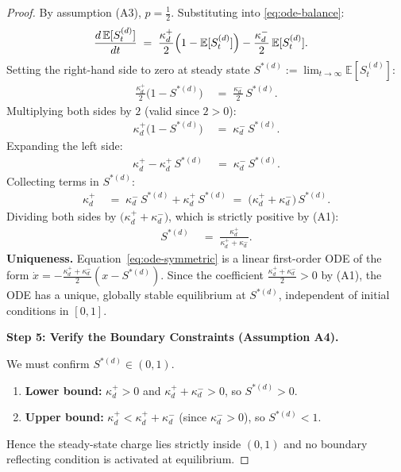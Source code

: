 \documentclass[12pt,openany]{book}
\numberwithin{equation}{chapter}
\theoremstyle{plain}
\theoremstyle{definition}
\theoremstyle{remark}
\def\mathcal#1{#1}%
\begin{document}
\begin{proof}
\noindent
By assumption (A3), $p = \tfrac{1}{2}$.  Substituting into
\eqref{eq:ode-balance}:
\begin{align}
  \frac{d\,\mathbb{E}[\mathcal{S}_t^{(d)}]}{dt}
  &\;=\;
  \frac{\kappa_d^{+}}{2}
  \Bigl(1 - \mathbb{E}[\mathcal{S}_t^{(d)}]\Bigr)
  -
  \frac{\kappa_d^{-}}{2}
  \,\mathbb{E}[\mathcal{S}_t^{(d)}].
  \label{eq:ode-symmetric}
\end{align}
Setting the right-hand side to zero at steady state
$\mathcal{S}^{*(d)} := \lim_{t\to\infty}
\mathbb{E}[\mathcal{S}_t^{(d)}]$:
\begin{align}
  \frac{\kappa_d^{+}}{2}
  \bigl(1 - \mathcal{S}^{*(d)}\bigr)
  &\;=\;
  \frac{\kappa_d^{-}}{2}\,\mathcal{S}^{*(d)}.
  \label{eq:balance-eqn}
\end{align}
Multiplying both sides by $2$ (valid since $2 > 0$):
\begin{align}
  \kappa_d^{+}\bigl(1 - \mathcal{S}^{*(d)}\bigr)
  &\;=\;
  \kappa_d^{-}\,\mathcal{S}^{*(d)}.
  \label{eq:balance-no-half}
\end{align}
Expanding the left side:
\begin{align}
  \kappa_d^{+} - \kappa_d^{+}\,\mathcal{S}^{*(d)}
  &\;=\;
  \kappa_d^{-}\,\mathcal{S}^{*(d)}.
  \label{eq:balance-expanded}
\end{align}
Collecting terms in $\mathcal{S}^{*(d)}$:
\begin{align}
  \kappa_d^{+}
  &\;=\;
  \kappa_d^{-}\,\mathcal{S}^{*(d)}
  + \kappa_d^{+}\,\mathcal{S}^{*(d)}
  \;=\;
  \bigl(\kappa_d^{+} + \kappa_d^{-}\bigr)\,\mathcal{S}^{*(d)}.
  \label{eq:balance-collected}
\end{align}
Dividing both sides by
$\bigl(\kappa_d^{+} + \kappa_d^{-}\bigr)$, which is strictly
positive by (A1):
\begin{align}
  \mathcal{S}^{*(d)}
  &\;=\;
  \frac{\kappa_d^{+}}{\kappa_d^{+} + \kappa_d^{-}}.
  \label{eq:steady-state-formula}
\end{align}
\textbf{Uniqueness.}  Equation~\eqref{eq:ode-symmetric} is a
linear first-order ODE of the form
$\dot{x} = -\tfrac{\kappa_d^{+}+\kappa_d^{-}}{2}(x -
\mathcal{S}^{*(d)})$.  Since the coefficient
$\tfrac{\kappa_d^{+}+\kappa_d^{-}}{2} > 0$ by (A1), the ODE
has a unique, globally stable equilibrium at
$\mathcal{S}^{*(d)}$, independent of initial conditions in
$[0,1]$.  \checkmark

\medskip
\noindent\textbf{Step 5: Verify the Boundary Constraints
(Assumption A4).}

\noindent
We must confirm $\mathcal{S}^{*(d)} \in (0,1)$.
\begin{enumerate}
  \item \textbf{Lower bound:}
    $\kappa_d^{+} > 0$ and
    $\kappa_d^{+} + \kappa_d^{-} > 0$, so
    $\mathcal{S}^{*(d)} > 0$. \checkmark
  \item \textbf{Upper bound:}
    $\kappa_d^{+} < \kappa_d^{+} + \kappa_d^{-}$
    (since $\kappa_d^{-} > 0$), so
    $\mathcal{S}^{*(d)} < 1$. \checkmark
\end{enumerate}
Hence the steady-state charge lies strictly inside $(0,1)$
and no boundary reflecting condition is activated at
equilibrium.


\end{proof}
\end{document}
